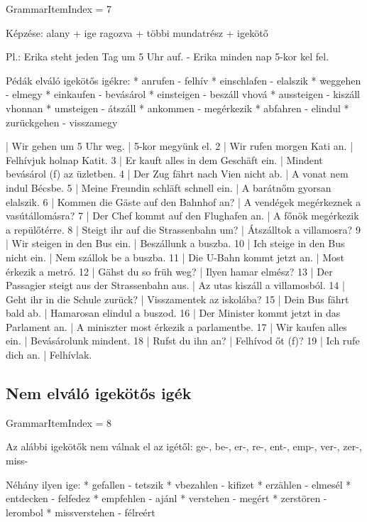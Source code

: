 \documentclass{article}
\newenvironment{desc}{\verbatim}{\endverbatim}
\newenvironment{exmp}{\verbatim}{\endverbatim}
\begin{document}
GrammarItemIndex = 7

\begin{desc}
Képzése: alany + ige ragozva + többi mundatrész + igekötő

Pl.: Erika steht jeden Tag um 5 Uhr auf. - Erika minden nap 5-kor kel fel.

Pédák elváló igekötős igékre:
* anrufen - felhív
* einschlafen - elalszik
* weggehen - elmegy
* einkaufen - bevásárol
* einsteigen - beszáll vhová
* aussteigen - kiszáll vhonnan
* umsteigen - átszáll
* ankommen - megérkezik
* abfahren - elindul
* zurückgehen - visszamegy
\end{desc}

\begin{exmp}
1 | Wir gehen um 5 Uhr weg. | 5-kor megyünk el.
2 | Wir rufen morgen Kati an. | Felhívjuk holnap Katit.
3 | Er kauft alles in dem Geschäft ein. | Mindent bevásárol (f) az üzletben.
4 | Der Zug fährt nach Vien nicht ab. | A vonat nem indul Bécsbe.
5 | Meine Freundin schläft schnell ein. | A barátnőm gyorsan elalszik.
6 | Kommen die Gäste auf den Bahnhof an? | A vendégek megérkeznek a vasútállomásra?
7 | Der Chef kommt auf den Flughafen an. | A főnök megérkezik a repülőtérre.
8 | Steigt ihr auf die Strassenbahn um? | Átszálltok a villamosra?
9 | Wir steigen in den Bus ein. | Beszállunk a buszba.
10 | Ich steige in den Bus nicht ein. | Nem szállok be a buszba.
11 | Die U-Bahn kommt jetzt an. | Most érkezik a metró.
12 | Gähst du so früh weg? | Ilyen hamar elmész?
13 | Der Passagier steigt aus der Strassenbahn aus. | Az utas kiszáll a villamosból.
14 | Geht ihr in die Schule zurück? | Visszamentek az iskolába?
15 | Dein Bus fährt bald ab. | Hamarosan elindul a buszod.
16 | Der Minister kommt jetzt in das Parlament an. | A miniszter most érkezik a parlamentbe.
17 | Wir kaufen alles ein. | Bevásárolunk mindent.
18 | Rufst du ihn an? | Felhívod őt (f)?
19 | Ich rufe dich an. | Felhívlak.
\end{exmp}

\subsection{Nem elváló igekötős igék}

GrammarItemIndex = 8

\begin{desc}
Az alábbi igekötők nem válnak el az igétől:
ge-, be-, er-, re-, ent-, emp-, ver-, zer-, miss-

Néhány ilyen ige:
* gefallen - tetszik
* vbezahlen - kifizet
* erzählen - elmesél
* entdecken - felfedez
* empfehlen - ajánl
* verstehen - megért
* zerstören - lerombol
* missverstehen - félreért
\end{desc}
\end{document}
